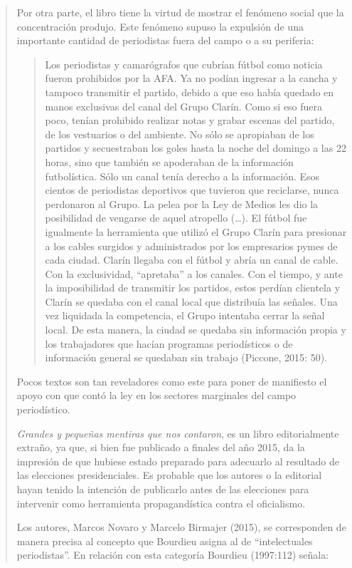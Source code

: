 \begin{quote}
Por otra parte, el libro tiene la virtud de mostrar el fenómeno social que la concentración produjo. Este fenómeno supuso la expulsión de una importante cantidad de periodistas fuera del campo o a su periferia:

\begin{quote}
	Los periodistas y camarógrafos que cubrían fútbol como noticia fueron prohibidos por la AFA. Ya no podían ingresar a la cancha y tampoco transmitir el partido, debido a que eso había quedado en manos exclusivas del canal del Grupo Clarín. Como si eso fuera poco, tenían prohibido realizar notas y grabar escenas del partido, de los vestuarios o del ambiente. No sólo se apropiaban de los partidos y secuestraban los goles hasta la noche del domingo a las 22 horas, sino que también se apoderaban de la información futbolística. Sólo un canal tenía derecho a la información. Esos cientos de periodistas deportivos que tuvieron que reciclarse, nunca perdonaron al Grupo. La pelea por la Ley de Medios les dio la posibilidad de vengarse de aquel atropello (\dots). El fútbol fue igualmente la herramienta que utilizó el Grupo Clarín para presionar a los cables surgidos y administrados por los empresarios pymes de cada ciudad. Clarín llegaba con el fútbol y abría un canal de cable. Con la exclusividad, \enquote{apretaba} a los canales. Con el tiempo, y ante la imposibilidad de transmitir los partidos, estos perdían clientela y Clarín se quedaba con el canal local que distribuía las señales. Una vez liquidada la competencia, el Grupo intentaba cerrar la señal local. De esta manera, la ciudad se quedaba sin información propia y los trabajadores que hacían programas periodísticos o de información general se quedaban sin trabajo (Piccone, 2015: 50).
\end{quote}


Pocos textos son tan reveladores como este para poner de manifiesto el apoyo con que contó la ley en los sectores marginales del campo periodístico.

\emph{Grandes y pequeñas mentiras que nos contaron}, es un libro editorialmente extraño, ya que, si bien fue publicado a finales del año 2015, da la impresión de que hubiese estado preparado para adecuarlo al resultado de las elecciones presidenciales. Es probable que los autores o la editorial hayan tenido la intención de publicarlo antes de las elecciones para intervenir como herramienta propagandística contra el oficialismo.

Los autores, Marcos Novaro y Marcelo Birmajer (2015), se corresponden de manera precisa al concepto que Bourdieu asigna al de ``intelectuales periodistas''. En relación con esta categoría Bourdieu (1997:112) señala:


\end{quote}
